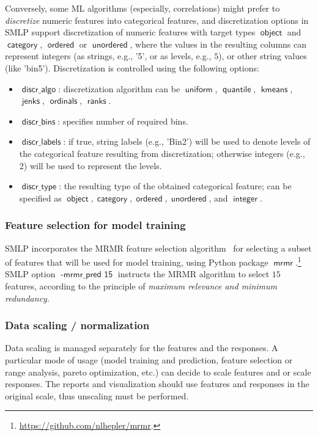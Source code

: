 \documentclass[a4paper,parskip=half]{article} %
\newcommand*\option[1]{\operatorname{\mathsf{#1}}} %
\newcommand*\package[1]{\operatorname{\mathsf{#1}}} %
\newcommand*\dtype[1]{\operatorname{\mathsf{#1}}} %
\begin{document}
Conversely, some ML algorithms (especially, correlations)
might prefer to \emph{discretize} numeric features into categorical features, and discretization options
in SMLP support discretization of numeric features with target types $\dtype{object}$ and $\dtype{category}$, 
 $\dtype{ordered}$ or  $\dtype{unordered}$, where the values in the resulting columns can represent integers 
(as strings,  e.g.,  '5', or as levels, e.g., $5$), or other string values (like 'bin5'). Discretization is controlled
using the following options: 
\begin{itemize}
\item $\option{discr\_algo}$: discretization algorithm can be $\option{uniform}$, $\option{quantile}$, 
$\option{kmeans}$, $\option{jenks}$, $\option{ordinals}$, $\option{ranks}$.
\item $\option{discr\_bins}$: specifies number of required bins.
\item $\option{discr\_labels}$: if true, string labels (e.g., 'Bin2') will be used to denote levels of the categorical feature
resulting from discretization; otherwise integers (e.g., 2) will be used to represent the levels.
\item $\option{discr\_type}$: the resulting type of the obtained categorical feature; can be specified as 
$\dtype{object}, \dtype{category}, \dtype{ordered}, \dtype{unordered}$, and $\dtype{integer}$.
\end{itemize}


\subsubsection{Feature selection for model training}\label{sec:mrmr:pred}

SMLP incorporates the MRMR feature selection algorithm~\cite{DBLP:journals/jbcb/DingP05} 
for selecting a subset of features that will be used for model training, using Python package 
$\package{mrmr}.$\footnote{\url{https://github.com/nlhepler/mrmr}.}
SMLP option $\option{-mrmr\_pred\,\,15}$ instructs the MRMR algorithm to select $15$ features, 
according to the principle of \emph{maximum relevance and minimum redundancy}.

\subsubsection{Data scaling / normalization}

Data scaling is managed separately for the features and the responses. A particular mode of usage
(model training and prediction, feature selection or range analysis, pareto optimization, etc.)
can decide to scale features and or scale responses. The reports and visualization should use
features and responses in the original scale, thus unscaling must be performed. 
\end{document}
